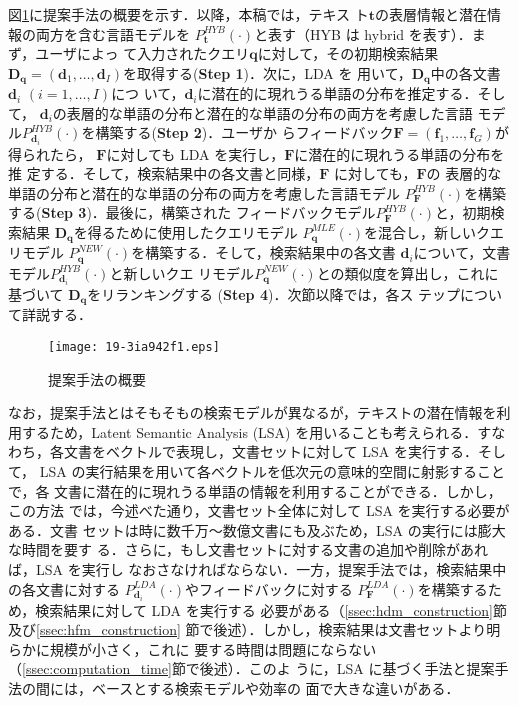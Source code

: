 \documentclass[japanese]{jnlp_1.4}
\begin{document}
図\ref{fig:proposed_method}に提案手法の概要を示す．以降，本稿では，テキス
ト$\bm{t}$の表層情報と潜在情報の両方を含む言語モデルを
$P^{HYB}_{\bm{t}}(\cdot)$と表す（HYB は hybrid を表す）．まず，ユーザによっ
て入力されたクエリ$\bm{q}$に対して，その初期検索結果$\bm{D}_{\bm{q}} =
(\bm{d}_{1}, \dots, \bm{d}_{I})$を取得する(\textbf{Step 1})．次に，LDA を
用いて，$\bm{D}_{\bm{q}}$中の各文書$\bm{d}_{i}$ $(i = 1, \dots, I)$につ
いて，$\bm{d}_{i}$に潜在的に現れうる単語の分布を推定する．そして，
$\bm{d}_{i}$の表層的な単語の分布と潜在的な単語の分布の両方を考慮した言語
モデル$P^{HYB}_{\bm{d}_{i}}(\cdot)$を構築する(\textbf{Step 2})．ユーザか
らフィードバック$\bm{F} = (\bm{f}_{1}, \dots, \bm{f}_{G})$が得られたら，
$\bm{F}$に対しても LDA を実行し，$\bm{F}$に潜在的に現れうる単語の分布を推
定する．そして，検索結果中の各文書と同様，$\bm{F}$ に対しても，$\bm{F}$の
表層的な単語の分布と潜在的な単語の分布の両方を考慮した言語モデル
$P^{HYB}_{\bm{F}}(\cdot)$を構築する(\textbf{Step 3})．最後に，構築された
フィードバックモデル$P^{HYB}_{\bm{F}}(\cdot)$と，初期検索結果
$\bm{D}_{\bm{q}}$を得るために使用したクエリモデル
$P^{MLE}_{\bm{q}}(\cdot)$を混合し，新しいクエリモデル
$P^{NEW}_{\bm{q}}(\cdot)$を構築する．そして，検索結果中の各文書
$\bm{d}_{i}$について，文書モデル$P^{HYB}_{\bm{d}_{i}}(\cdot)$と新しいクエ
リモデル$P^{NEW}_{\bm{q}}(\cdot)$との類似度を算出し，これに基づいて
$\bm{D}_{\bm{q}}$をリランキングする (\textbf{Step 4})．次節以降では，各ス
テップについて詳説する．

\begin{figure}[t]
 \begin{center}
  \texttt{[image: 19-3ia942f1.eps]}
 \end{center}
  \caption{提案手法の概要}
  \label{fig:proposed_method}
\end{figure}

なお，提案手法とはそもそもの検索モデルが異なるが，テキストの潜在情報を利
用するため，Latent Semantic Analysis (LSA) を用いることも考えられる．すな
わち，各文書をベクトルで表現し，文書セットに対して LSA を実行する．そして，
LSA の実行結果を用いて各ベクトルを低次元の意味的空間に射影することで，各
文書に潜在的に現れうる単語の情報を利用することができる．しかし，この方法
では，今述べた通り，文書セット全体に対して LSA を実行する必要がある．文書
セットは時に数千万〜数億文書にも及ぶため，LSA の実行には膨大な時間を要す
る．さらに，もし文書セットに対する文書の追加や削除があれば，LSA を実行し
なおさなければならない．一方，提案手法では，検索結果中の各文書に対する
$P^{LDA}_{\bm{d}_{i}}(\cdot)$やフィードバックに対する
$P^{LDA}_{\bm{F}}(\cdot)$を構築するため，検索結果に対して LDA を実行する
必要がある（\ref{ssec:hdm_construction}節及び\ref{ssec:hfm_construction}
節で後述）．しかし，検索結果は文書セットより明らかに規模が小さく，これに
要する時間は問題にならない（\ref{ssec:computation_time}節で後述）．このよ
うに，LSA に基づく手法と提案手法の間には，ベースとする検索モデルや効率の
面で大きな違いがある．
\end{document}

